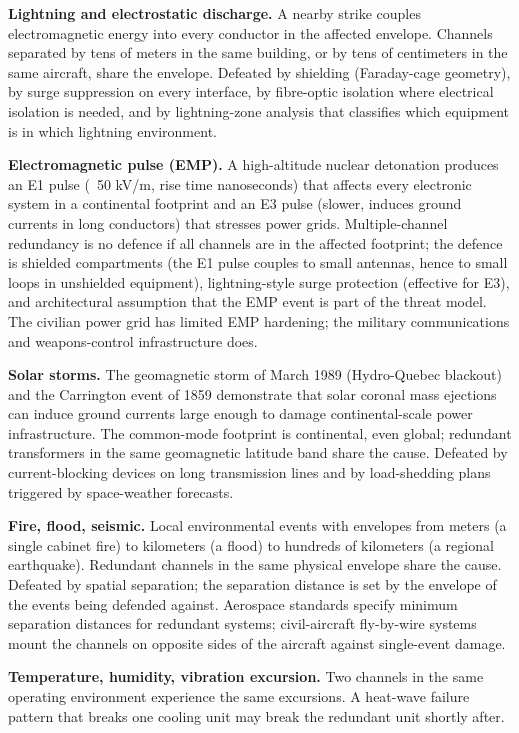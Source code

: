 \textbf{Lightning and electrostatic discharge.} A nearby strike couples electromagnetic energy into every conductor in the affected envelope. Channels separated by tens of meters in the same building, or by tens of centimeters in the same aircraft, share the envelope. Defeated by shielding (Faraday-cage geometry), by surge suppression on every interface, by fibre-optic isolation where electrical isolation is needed, and by lightning-zone analysis that classifies which equipment is in which lightning environment.

\textbf{Electromagnetic pulse (EMP).} A high-altitude nuclear detonation produces an E1 pulse (~50 kV/m, rise time nanoseconds) that affects every electronic system in a continental footprint and an E3 pulse (slower, induces ground currents in long conductors) that stresses power grids. Multiple-channel redundancy is no defence if all channels are in the affected footprint; the defence is shielded compartments (the E1 pulse couples to small antennas, hence to small loops in unshielded equipment), lightning-style surge protection (effective for E3), and architectural assumption that the EMP event is part of the threat model. The civilian power grid has limited EMP hardening; the military communications and weapons-control infrastructure does.

\textbf{Solar storms.} The geomagnetic storm of March 1989 (Hydro-Quebec blackout) and the Carrington event of 1859 demonstrate that solar coronal mass ejections can induce ground currents large enough to damage continental-scale power infrastructure. The common-mode footprint is continental, even global; redundant transformers in the same geomagnetic latitude band share the cause. Defeated by current-blocking devices on long transmission lines and by load-shedding plans triggered by space-weather forecasts.

\textbf{Fire, flood, seismic.} Local environmental events with envelopes from meters (a single cabinet fire) to kilometers (a flood) to hundreds of kilometers (a regional earthquake). Redundant channels in the same physical envelope share the cause. Defeated by spatial separation; the separation distance is set by the envelope of the events being defended against. Aerospace standards specify minimum separation distances for redundant systems; civil-aircraft fly-by-wire systems mount the channels on opposite sides of the aircraft against single-event damage.

\textbf{Temperature, humidity, vibration excursion.} Two channels in the same operating environment experience the same excursions. A heat-wave failure pattern that breaks one cooling unit may break the redundant unit shortly after.

